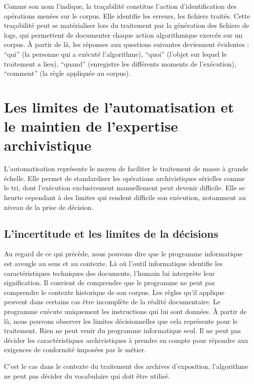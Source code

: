 Comme son nom l'indique, la traçabilité constitue l'action d'identification des opérations menées sur le corpus. Elle identifie les erreurs, les fichiers traités. Cette traçabilité peut se matérialiser lors du traitement par la génération des fichiers de logs, qui permettent de documenter chaque action algorithmique exercée sur un corpus. À partir de là, les réponses aux questions suivantes deviennent évidentes : \enquote{qui} (la personne qui a exécuté l'algorithme), \enquote{quoi} (l'objet sur lequel le traitement a lieu), \enquote{quand} (enregistre les différents moments de l'exécution), \enquote{comment} (la règle appliquée au corpus).



\section{ Les limites de l’automatisation et le maintien de l’expertise archivistique}

L'automatisation représente le moyen de faciliter le traitement de masse à grande échelle. Elle permet de standardiser les opérations archivistiques sérielles comme le tri, dont l'exécution exclusivement manuellement peut devenir difficile. Elle se heurte cependant à des limites qui rendent difficile son exécution, notamment au niveau de la prise de décision.

\subsection*{L’incertitude et les limites de la décisions}

Au regard de ce qui précède, nous pouvons dire que le programme informatique est aveugle au sens et au contexte. Là où l'outil informatique identifie les caractéristiques techniques des documents, l'humain lui interprète leur signification. Il convient de comprendre que le programme ne peut pas comprendre le contexte historique de son corpus. Les règles qu'il applique peuvent dans certains cas être incomplète de la réalité documentaire. Le programme exécute uniquement les instructions qui lui sont données. À partir de là, nous pouvons observer les limites décisionnelles que cela représente pour le traitement. Rien ne peut venir du programme informatique seul. Il ne peut pas décider les caractéristiques archivistiques à prendre en compte pour répondre aux exigences de conformité imposées par le métier.

C'est le cas dans le contexte du traitement des archives d'exposition, l'algorithme ne peut pas décider du vocabulaire qui doit être utilisé.



